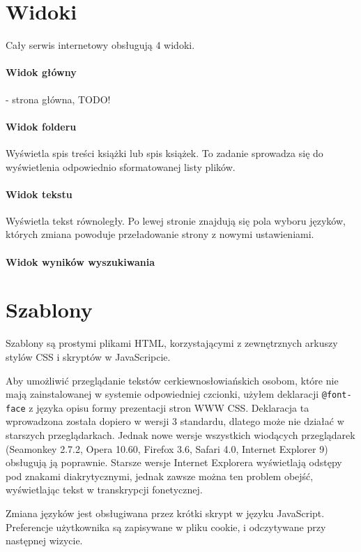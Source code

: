 \documentclass{pracamgr}
\begin{document}
\section{Widoki}

Cały serwis internetowy obsługują 4 widoki.

\paragraph{Widok główny}
- strona główna, TODO!

\paragraph{Widok folderu}
Wyświetla spis treści książki lub spis książek.  To zadanie sprowadza
się do wyświetlenia odpowiednio sformatowanej listy plików.

\paragraph{Widok tekstu}
Wyświetla tekst równoległy. Po lewej stronie znajdują się pola wyboru
języków, których zmiana powoduje przeładowanie strony z nowymi
ustawieniami.

\paragraph{Widok wyników wyszukiwania}

\section{Szablony}

Szablony są prostymi plikami HTML, korzystającymi z zewnętrznych
arkuszy stylów CSS i skryptów w JavaScripcie.

Aby umożliwić przeglądanie tekstów cerkiewno\-{}słowiańskich osobom,
które nie mają zainstalowanej w systemie odpowiedniej czcionki, użyłem
deklaracji {\tt @font-face} z języka opisu formy prezentacji stron WWW
CSS. Deklaracja ta wprowadzona została dopiero w wersji 3 standardu,
dlatego może nie działać w starszych przeglądarkach. Jednak nowe
wersje wszystkich wiodących przeglądarek (Seamonkey 2.7.2, Opera
10.60, Firefox 3.6, Safari 4.0, Internet Explorer 9) obsługują ją
poprawnie. Starsze wersje Internet Explorera wyświetlają odstępy pod
znakami diakrytycznymi, jednak zawsze można ten problem obejść,
wyświetlając tekst w transkrypcji fonetycznej.

Zmiana języków jest obsługiwana przez krótki skrypt w języku
JavaScript. Preferencje użytkownika są zapisywane w pliku cookie, i
odczytywane przy następnej wizycie.
\end{document}
